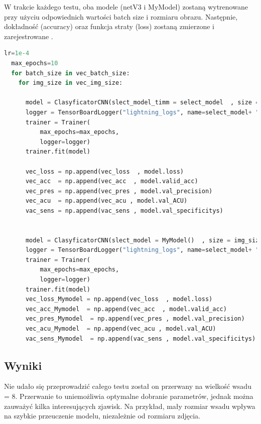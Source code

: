 \documentclass[12pt,twoside]{article}
\begin{document}
W trakcie każdego testu, oba modele (netV3 i MyModel) zostaną wytrenowane przy użyciu odpowiednich wartości batch size i rozmiaru obrazu. Następnie, dokładność (accuracy) oraz funkcja straty (loss) zostaną zmierzone i zarejestrowane .
\begin{lstlisting}[language=Python,caption=Kod do ekperymentu II, label={kod_Transformacja}]
  lr=1e-4
  max_epochs=10
  for batch_size in vec_batch_size:
    for img_size in vec_img_size:

      model = ClasyficatorCNN(slect_model_timm = select_model  , size = img_size ,batch_size=batch_size ,lr=lr, pretrained=pretrained)
      logger = TensorBoardLogger("lightning_logs", name=select_model+ "img_size = " + str(img_size)+ "batch_size = "+str(batch_size), default_hp_metric=False)
      trainer = Trainer(
          max_epochs=max_epochs,
          logger=logger)
      trainer.fit(model)
      
      vec_loss = np.append(vec_loss  , model.loss)
      vec_acc  = np.append(vec_acc  , model.valid_acc)
      vec_pres = np.append(vec_pres , model.val_precision)
      vec_acu  = np.append(vec_acu , model.val_ACU)
      vac_sens = np.append(vac_sens , model.val_specificitys)


      model = ClasyficatorCNN(slect_model = MyModel()  , size = img_size ,batch_size = batch_size,lr=lr, pretrained=pretrained)
      logger = TensorBoardLogger("lightning_logs", name=select_model+ "img_size = " +  str(img_size)+"batch_size = "+str(batch_size) , default_hp_metric=False)
      trainer = Trainer(
          max_epochs=max_epochs,
          logger=logger)
      trainer.fit(model)
      vec_loss_Mymodel = np.append(vec_loss  , model.loss)
      vec_acc_Mymodel  = np.append(vec_acc  , model.valid_acc)
      vec_pres_Mymodel  = np.append(vec_pres , model.val_precision)
      vec_acu_Mymodel  = np.append(vec_acu , model.val_ACU)
      vac_sens_Mymodel  = np.append(vac_sens , model.val_specificitys)
\end{lstlisting}

\subsection{Wyniki}
Nie udało się przeprowadzić całego testu został on przerwany na wielkość wsadu = 8. Przerwanie to uniemożliwia optymalne dobranie parametrów, jednak można zauważyć kilka interesujących zjawisk. Na przykład, mały rozmiar wsadu wpływa na szybkie przeuczenie modelu, niezależnie od rozmiaru zdjęcia.
\end{document}
